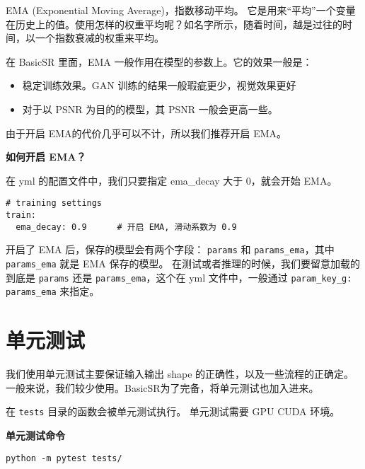 \documentclass[../main.tex]{subfiles}
\begin{document}
EMA (Exponential Moving Average)，指数移动平均。
它是用来“平均”一个变量在历史上的值。使用怎样的权重平均呢？如名字所示，随着时间，越是过往的时间，以一个指数衰减的权重来平均。

在 BasicSR 里面，EMA 一般作用在模型的参数上。它的效果一般是：

\begin{itemize}
	\item 稳定训练效果。GAN 训练的结果一般瑕疵更少，视觉效果更好
	\item 对于以 PSNR 为目的的模型，其 PSNR 一般会更高一些。
\end{itemize}

由于开启 EMA的代价几乎可以不计，所以我们推荐开启 EMA。

\begin{hl} %
	\textbf{如何开启 EMA？}

	在 yml 的配置文件中，我们只要指定 ema\_decay 大于 0，就会开始 EMA。


\begin{verbatim}
# training settings
train:
  ema_decay: 0.9      # 开启 EMA, 滑动系数为 0.9
\end{verbatim}
\end{hl}

开启了 EMA 后，保存的模型会有两个字段： \texttt{params} 和 \texttt{params\_ema}，其中  \texttt{params\_ema} 就是 EMA 保存的模型。
在测试或者推理的时候，我们要留意加载的到底是 \texttt{params} 还是 \texttt{params\_ema}，这个在 yml 文件中，一般通过  \texttt{param\_key\_g: params\_ema} 来指定。


\section{单元测试}

我们使用单元测试主要保证输入输出 shape 的正确性，以及一些流程的正确定。
一般来说，我们较少使用。BasicSR为了完备，将单元测试也加入进来。

在 \texttt{tests} 目录的函数会被单元测试执行。
单元测试需要 GPU CUDA 环境。


\begin{hl} %
	\textbf{单元测试命令}


	\begin{verbatim}
python -m pytest tests/
	\end{verbatim}
\end{hl}
\end{document}
